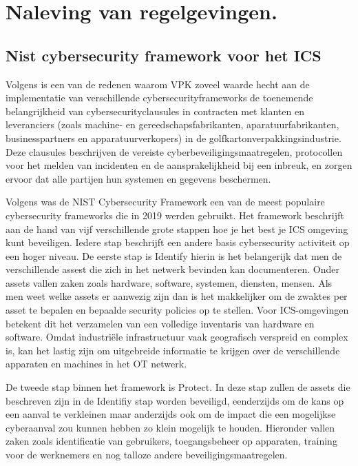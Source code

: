 \section{Naleving van regelgevingen.}
\subsection{Nist cybersecurity framework voor het ICS}

Volgens \textcite{fefco2025} is een van de redenen waarom VPK zoveel waarde hecht aan de implementatie van verschillende cybersecurityframeworks de toenemende belangrijkheid van cybersecurityclausules in contracten met klanten en leveranciers (zoals machine- en gereedschapsfabrikanten, aparatuurfabrikanten, businesspartners en apparatuurverkopers) in de golfkartonverpakkingsindustrie. Deze clausules beschrijven de vereiste cyberbeveiligingsmaatregelen, protocollen voor het melden van incidenten en de aansprakelijkheid bij een inbreuk, en zorgen ervoor dat alle partijen hun systemen en gegevens beschermen.

\vspace{5mm}
Volgens \textcite{IndustrialDefender2025} was de NIST Cybersecurity Framework een van de meest populaire cybersecurity frameworks die in 2019 werden gebruikt. Het framework beschrijft aan de hand van vijf verschillende grote stappen hoe je het best je ICS omgeving kunt beveiligen. Iedere stap beschrijft een andere basis cybersecurity activiteit op een hoger niveau.
De eerste stap is Identify hierin is het belangerijk dat men de verschillende assest die zich in het netwerk bevinden kan documenteren. Onder assets vallen zaken zoals hardware, software, systemen, diensten, mensen. Als men weet welke assets er aanwezig zijn dan is het makkelijker om de zwaktes per asset te bepalen en bepaalde security policies op te stellen. Voor ICS-omgevingen betekent dit het verzamelen van een volledige inventaris van hardware en software. Omdat industriële infrastructuur vaak geografisch verspreid en complex is, kan het lastig zijn om uitgebreide informatie te krijgen over de verschillende apparaten en machines in het OT netwerk. \autocite{Nist2024}

\vspace{5mm}
De tweede stap binnen het framework is Protect. In deze stap zullen de assets die beschreven zijn in de Identifiy stap worden beveiligd, eenderzijds om de kans op een aanval te verkleinen maar anderzijds ook om de impact die een mogelijkse cyberaanval zou kunnen hebben zo klein mogelijk te houden. Hieronder vallen zaken zoals identificatie van gebruikers, toegangsbeheer op apparaten, training voor de werknemers en nog talloze andere beveiligingsmaatregelen. \autocite{Nist2024}

